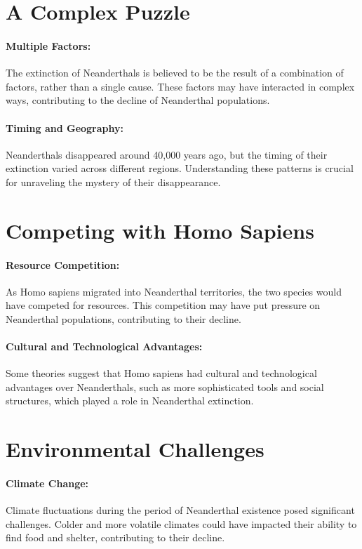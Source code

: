 \documentclass[a4paper,12pt]{book}
\begin{document}
\section*{A Complex Puzzle}

\paragraph{Multiple Factors:}
The extinction of Neanderthals is believed to be the result of a combination of factors, rather than a single cause. These factors may have interacted in complex ways, contributing to the decline of Neanderthal populations.

\paragraph{Timing and Geography:}
Neanderthals disappeared around 40,000 years ago, but the timing of their extinction varied across different regions. Understanding these patterns is crucial for unraveling the mystery of their disappearance.

\section*{Competing with Homo Sapiens}

\paragraph{Resource Competition:}
As Homo sapiens migrated into Neanderthal territories, the two species would have competed for resources. This competition may have put pressure on Neanderthal populations, contributing to their decline.

\paragraph{Cultural and Technological Advantages:}
Some theories suggest that Homo sapiens had cultural and technological advantages over Neanderthals, such as more sophisticated tools and social structures, which played a role in Neanderthal extinction.

\section*{Environmental Challenges}

\paragraph{Climate Change:}
Climate fluctuations during the period of Neanderthal existence posed significant challenges. Colder and more volatile climates could have impacted their ability to find food and shelter, contributing to their decline.
\end{document}
